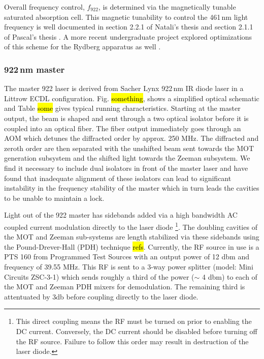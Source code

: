 Overall frequency control, $f_{922}$, is determined via the magnetically tunable saturated absorption cell.
This magnetic tunability to control the 461\,nm light frequency is well documented in section 2.2.1 of Natali's thesis \cite{MartinezdeEscolar2010} and section 2.1.1 of Pascal's thesis \cite{Mickelson2010b}.
A more recent undergraduate project explored optimizations of this scheme for the Rydberg apparatus as well \cite{MichaelViray2014}.

\subsubsection{922\,nm master}
The master 922 laser is derived from Sacher Lynx 922\,nm IR diode laser in a Littrow ECDL configuration.
Fig. \hl{something}, shows a simplified optical schematic and Table \hl{some} gives typical running characteristics.
Starting at the master output, the beam is shaped and sent through a two optical isolator before it is coupled into an optical fiber.
The fiber output immediately goes through an AOM which detunes the diffracted order by approx. 250 MHz.
The diffracted and zeroth order are then separated with the unshifted beam sent towards the MOT generation subsystem and the shifted light towards the Zeeman subsystem.
We find it necessary to include dual isolators in front of the master laser and have found that inadequate alignment of these isolators can lead to significant instability in the frequency stability of the master which in turn leads the cavities to be unable to maintain a lock.

Light out of the 922 master has sidebands added via a high bandwidth AC coupled current modulation directly to the laser diode 
\footnote{This direct coupling means the RF must be turned on prior to enabling the DC current. 
Conversely, the DC current should be disabled before turning off the RF source. 
Failure to follow this order may result in destruction of the laser diode.}.
The doubling cavities of the MOT and Zeeman sub-systems are length stabilized via these sidebands using the Pound-Drever-Hall (PDH) technique \hl{refs}.
Currently, the RF source in use is a PTS 160 from Programmed Test Sources with an output power of 12 dbm and frequency of 39.55 MHz.
This RF is sent to a 3-way power splitter (model: Mini Circuits ZSC-3-1) which sends roughly a third of the power ($\sim$ 4 dbm) to each of the MOT and Zeeman PDH mixers for demodulation. 
The remaining third is attentuated by 3db before coupling directly to the laser diode.

